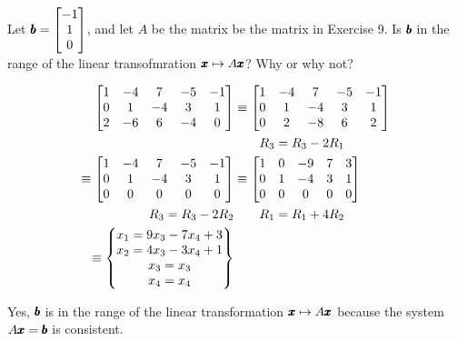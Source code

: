 \documentclass{../mathhomework}
\newenvironment{Mat}{\begin{bmatrix}}{\end{bmatrix}}
\begin{document}
\begin{problem}[1.8\#11]
    Let $\Vect{b} = \begin{Mat}
        -1 \\ 1 \\ 0
    \end{Mat}$, and let $A$ be the matrix be the matrix in Exercise 9. Is $\pmb{b}$ in the range of the linear transofmration $\pmb{x} \mapsto A\pmb{x}$? Why or why not?

    \begin{solution}
        \begin{align*}
            \begin{Mat}
                1 & -4 & 7 & -5 & -1 \\
                0 & 1 & -4 & 3 & 1 \\
                2 & -6 & 6 & -4 & 0
            \end{Mat} 
            & \equiv \begin{Mat}
                1 & -4 & 7 & -5 & -1 \\
                0 & 1 & -4 & 3 & 1 \\
                0 & 2 & -8 & 6 & 2
            \end{Mat} 
            \\ 
            & \qquad{} R_3 = R_3 - 2R_1 \\
            \equiv \begin{Mat}
                1 & -4 & 7 & -5 & -1 \\
                0 & 1 & -4 & 3 & 1 \\
                0 & 0 & 0 & 0 & 0
            \end{Mat}
            & \equiv \begin{Mat}
                1 & 0 & -9 & 7 & 3 \\
                0 & 1 & -4 & 3 & 1 \\
                0 & 0 & 0 & 0 & 0
            \end{Mat}
            \\ 
            R_3 = R_3 - 2R_2 & \qquad{} R_1 = R_1 + 4R_2 \\
            \equiv \begin{Bmatrix}
                x_1 = 9x_3 - 7x_4 + 3 \\ 
                x_2 = 4x_3 - 3x_4 + 1 \\ 
                x_3 = x_3 \\ 
                x_4 = x_4
            \end{Bmatrix}
        \end{align*}

        Yes, $\pmb{b}$ is in the range of the linear transformation $\pmb{x} \mapsto A\pmb{x}$ because the system $A\pmb{x} = \pmb{b}$ is consistent.
    \end{solution}
\end{problem}
\end{document}
